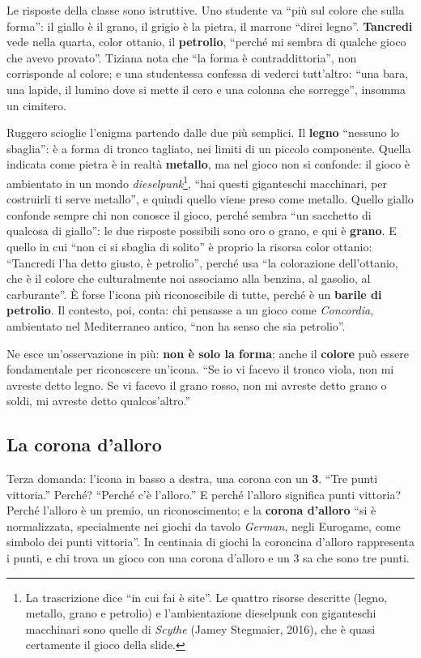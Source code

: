 Le risposte della classe sono istruttive. Uno studente va ``più sul colore che sulla
forma'': il giallo è il grano, il grigio è la pietra, il marrone ``direi legno''.
\textbf{Tancredi} vede nella quarta, color ottanio, il \textbf{petrolio}, ``perché mi
sembra di qualche gioco che avevo provato''. Tiziana nota che ``la forma è
contraddittoria'', non corrisponde al colore; e una studentessa confessa di vederci
tutt'altro: ``una bara, una lapide, il lumino dove si mette il cero e una colonna che
sorregge'', insomma un cimitero.

Ruggero scioglie l'enigma partendo dalle due più semplici. Il \textbf{legno} ``nessuno
lo sbaglia'': è a forma di tronco tagliato, nei limiti di un piccolo componente. Quella
indicata come pietra è in realtà \textbf{metallo}, ma nel gioco non si confonde: il
gioco è ambientato in un mondo \emph{dieselpunk}\footnote{La trascrizione dice ``in cui
fai è site''. Le quattro risorse descritte (legno, metallo, grano e petrolio) e
l'ambientazione dieselpunk con giganteschi macchinari sono quelle di \emph{Scythe}
(Jamey Stegmaier, 2016), che è quasi certamente il gioco della slide.}, ``hai questi
giganteschi macchinari, per costruirli ti serve metallo'', e quindi quello viene preso
come metallo. Quello giallo confonde sempre chi non conosce il gioco, perché sembra
``un sacchetto di qualcosa di giallo'': le due risposte possibili sono oro o grano, e
qui è \textbf{grano}. E quello in cui ``non ci si sbaglia di solito'' è proprio la
risorsa color ottanio: ``Tancredi l'ha detto giusto, è petrolio'', perché usa ``la
colorazione dell'ottanio, che è il colore che culturalmente noi associamo alla benzina,
al gasolio, al carburante''. È forse l'icona più riconoscibile di tutte, perché è un
\textbf{barile di petrolio}. Il contesto, poi, conta: chi pensasse a un gioco come
\emph{Concordia}, ambientato nel Mediterraneo antico, ``non ha senso che sia petrolio''.

Ne esce un'osservazione in più: \textbf{non è solo la forma}; anche il \textbf{colore}
può essere fondamentale per riconoscere un'icona. ``Se io vi facevo il tronco viola,
non mi avreste detto legno. Se vi facevo il grano rosso, non mi avreste detto grano o
soldi, mi avreste detto qualcos'altro.''

\subsection{La corona d'alloro}

Terza domanda: l'icona in basso a destra, una corona con un \textbf{3}. ``Tre punti
vittoria.'' Perché? ``Perché c'è l'alloro.'' E perché l'alloro significa punti
vittoria? Perché l'alloro è un premio, un riconoscimento; e la \textbf{corona d'alloro}
``si è normalizzata, specialmente nei giochi da tavolo \emph{German}, negli Eurogame,
come simbolo dei punti vittoria''. In centinaia di giochi la coroncina d'alloro
rappresenta i punti, e chi trova un gioco con una corona d'alloro e un 3 sa che sono tre
punti.

